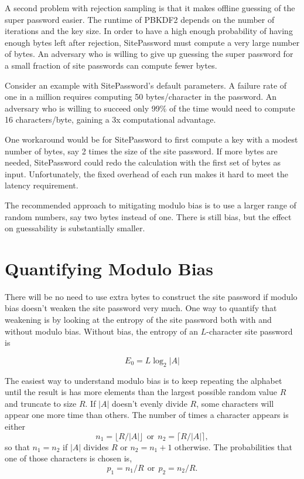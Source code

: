 \documentclass[11pt, oneside]{article}   	%
\begin{document}
A second problem with rejection sampling is that it makes offline guessing of the super password easier.  The runtime of PBKDF2 depends on the number of iterations and the key size.  In order to have a high enough probability of having enough bytes left after rejection, SitePassword must compute a very large number of bytes.  An adversary who is willing to give up guessing the super password for a small fraction of site passwords can compute fewer bytes.

Consider an example with SitePassword's default parameters.  A failure rate of one in a million requires computing 50 bytes/character in the password.  An adversary who is willing to succeed only 99\% of the time would need to compute 16 characters/byte, gaining a 3x computational advantage.

One workaround would be for SitePassword to first compute a key with a modest number of bytes, say 2 times the size of the site password.  If more bytes are needed, SitePassword could redo the calculation with the first set of bytes as input.  Unfortunately, the fixed overhead of each run makes it hard to meet the latency requirement.

The recommended approach to mitigating modulo bias is to use a larger range of random numbers, say two bytes instead of one.  There is still bias, but the effect on guessability is substantially smaller.

\section{Quantifying Modulo Bias}

There will be no need to use extra bytes to construct the site password if modulo bias doesn't weaken the site password very much.  One way to quantify that weakening is by looking at the entropy of the site password both with and without modulo bias.  Without bias, the entropy of an $L$-character site password is 

\begin{equation}
E_0 = L \log_2 |A|
\end{equation}

The easiest way to understand modulo bias is to keep repeating the alphabet until the result is has more elements than the largest possible random value $R$ and truncate to size $R$.  If $|A|$ doesn't evenly divide $R$, some characters will appear one more time than others.  The number of times a character appears is either
\begin{equation}
n_1 = \lfloor R/|A| \rfloor ~~\textrm{or}~~ n_2 = \lceil R/|A| \rceil,
\end{equation}
so that $n_1 = n_2$ if $|A|$ divides $R$ or $n_2 = n_1 + 1$ otherwise.  The probabilities that one of those characters is chosen is, 
\begin{equation}
p_1 = n_1/R ~~\textrm{or}~~ p_2 = n_2/R.
\end{equation}
\end{document}
